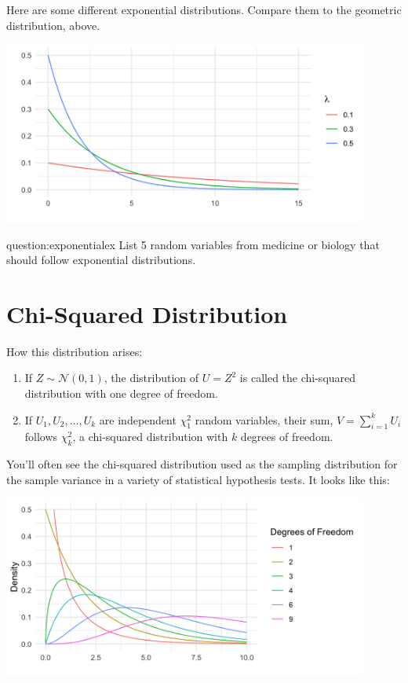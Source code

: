 Here are some different exponential distributions. Compare them to the geometric distribution, above.
\begin{center}
\includegraphics[width=0.9\textwidth]{img/l01-figure5-exponential-lambda-change.png}
\end{center}

\begin{question}{question:exponentialex}
List 5 random variables from medicine or biology that should follow exponential distributions.
\end{question}


\section{Chi-Squared Distribution}

How this distribution arises:
\begin{enumerate}
\item If $Z \sim \mathcal{N}(0, 1)$, the distribution of $U = Z^2$ is called the chi-squared distribution with one degree of freedom.
\item If $U_1, U_2, \dots, U_k$ are independent $\chi_1^2$ random variables, their sum,
$ V = \sum_{i=1}^k U_i $
follows $\chi_k^2$, a chi-squared distribution with $k$ degrees of freedom.
\end{enumerate}

You'll often see the chi-squared distribution used as the sampling distribution for the sample variance in a variety of statistical hypothesis tests. It looks like this:
\begin{center}
\includegraphics[width=0.9\textwidth]{img/hyp-example-chisq-distribution.png}
\end{center}

